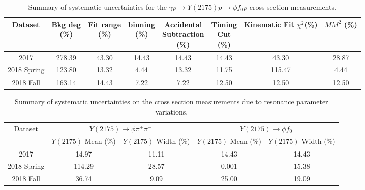 \begin{table}[htbp]
    \small
    \centering
    \caption{Summary of systematic uncertainties for the $\gamma p \rightarrow Y(2175) p \rightarrow \phi f_{0} p$ cross section measurements.}
    \label{tab.syserr.yphifo.1.1}
    \begin{tabular}{|c|c|c|c|c|c|c|c|}
        \hline
        Dataset&\thead{Bkg deg\\(\%)}&\thead{Fit range\\(\%)}&\thead{binning\\(\%)}&\thead{Accidental\\Subtraction\\(\%)}&\thead{Timing\\Cut\\(\%)}&\thead{Kinematic\\Fit $\chi^{2}$(\%)}&\thead{$MM^{2}$\\(\%)}\\
        \hline
        2017 & 278.39 & 43.30 & 14.43 & 14.43 & 14.43 & 43.30 & 28.87 \\ 
        2018 Spring & 123.80 & 13.32 & 4.44 & 13.32 & 11.75 & 115.47 & 4.44 \\ 
        2018 Fall & 163.14 & 14.43 & 7.22 & 7.22 & 12.50 & 12.50 & 12.50 \\
        \hline
    \end{tabular}
\end{table}

\begin{table}[htbp]
    \small
    \centering
    \caption{Summary of systematic uncertainties on the cross section measurements due to resonance parameter variations.}
    \label{tab.syserr.y}
    \begin{tabular}{|c|c|c|c|c|}
        \hline
        \multirow{2}{*}{Dataset} & \multicolumn{2}{c|}{$Y(2175)\rightarrow \phi \pi^{+} \pi^{-}$} & \multicolumn{2}{c|}{$Y(2175)\rightarrow \phi f_0$} \\
        \cline{2-5}
        & \thead{$Y(2175)$ Mean\\($\%$)} & \thead{$Y(2175)$ Width\\($\%$)} & \thead{$Y(2175)$ Mean\\($\%$)} & \thead{$Y(2175)$ Width\\($\%$)} \\
        \hline
        2017 & 14.97 & 11.11 & 14.43 & 14.43 \\ 
        2018 Spring & 114.29 & 28.57 & 0.001 & 15.38 \\ 
        2018 Fall & 36.74 & 9.09 & 25.00 & 19.09 \\
        \hline
    \end{tabular}
\end{table}

